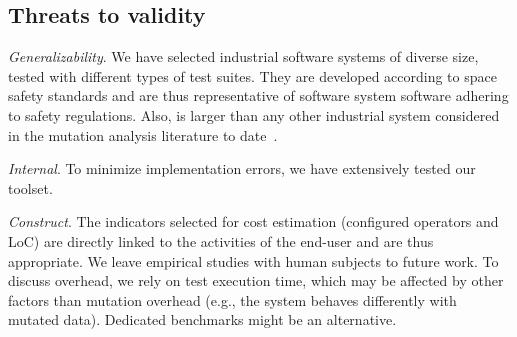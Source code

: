 






\subsection{Threats to validity}
\label{sec:threats:damat}


\emph{Generalizability}. We have selected industrial software systems of diverse size, tested with different types of test suites. They are developed according to space safety standards and are thus  representative of software system software adhering to safety regulations.
Also, \ESAIL is larger than any other industrial system considered in the mutation analysis literature to date~\cite{Ramler2017,delgado2018evaluation,Baker2013,denisov2018mull}.

{\emph{Internal}. To minimize implementation errors, we have extensively tested our toolset.}

{\emph{Construct}. The indicators selected for cost estimation (configured operators and LoC) are directly linked to the activities of the end-user and are thus appropriate. We leave empirical studies with human subjects to future work. To discuss overhead, we rely on test execution time, which may be affected by other factors than mutation overhead (e.g., the system behaves differently with mutated data). Dedicated benchmarks might be an alternative.}

